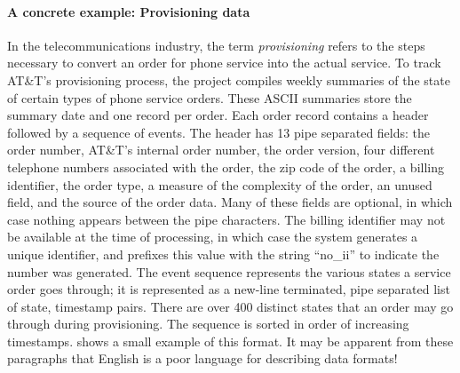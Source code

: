 \documentclass[11pt]{article}
\begin{document}


\paragraph*{A concrete example:  Provisioning data}
In the telecommunications industry, the term \textit{provisioning} refers to the steps necessary to convert an order for phone service into the actual 
service.  
To track AT\&T's provisioning process, the \dibbler{} project compiles
weekly summaries of the state of certain types of phone service orders.  
These ASCII summaries store the summary date and one record per order.
Each order record contains a header followed by a sequence of events.
The header has 13 pipe separated fields: the order number, AT\&T's
internal order number, the order version, four different telephone
numbers associated with the order, the zip code of the order, a
billing identifier, the order type, a measure of the complexity of the
order, an unused field, and the source of the order data.  Many of
these fields are optional, in which case nothing appears between the
pipe characters.  The billing identifier may not be available at the
time of processing, in which case the system generates a unique
identifier, and prefixes this value with the string ``no\_ii'' to
indicate the number was generated. The event sequence represents the
various states a service order goes through; it is represented as a
new-line terminated, pipe separated list of state, timestamp pairs.
There are over 400 distinct states that an order may go through during
provisioning.  The sequence is sorted in order of increasing timestamps.  shows a small example of
this format.
It may be apparent from these paragraphs that English is a poor
language for describing data formats!
\end{document}
